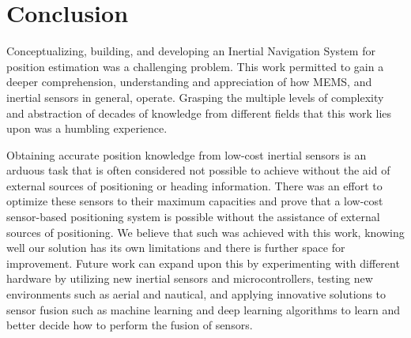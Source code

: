 \section{Conclusion}
Conceptualizing, building, and developing an Inertial Navigation System for position estimation was a challenging problem. This work permitted to gain a deeper comprehension, understanding and appreciation of how MEMS, and inertial sensors in general, operate. Grasping the multiple levels of complexity and abstraction of decades of knowledge from different fields that this work lies upon was a humbling experience.

Obtaining accurate position knowledge from low-cost inertial sensors is an arduous task that is often considered not possible to achieve without the aid of external sources of positioning or heading information. There was an effort to optimize these sensors to their maximum capacities and prove that a low-cost sensor-based positioning system is possible without the assistance of external sources of positioning. We believe that such was achieved with this work, knowing well our solution has its own limitations and there is further space for improvement. Future work can expand upon this by experimenting with different hardware by utilizing new inertial sensors and microcontrollers, testing new environments such as aerial and nautical, and applying innovative solutions to sensor fusion such as machine learning and deep learning algorithms to learn and better decide how to perform the fusion of sensors.